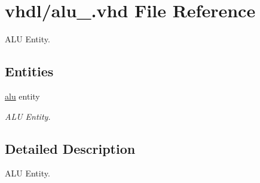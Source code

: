 \hypertarget{alu___8vhd}{}\section{vhdl/alu\+\_\+.vhd File Reference}
\label{alu___8vhd}


A\+LU Entity.  


\subsection*{Entities}
\begin{DoxyCompactItemize}
\item 
\hyperlink{classalu}{alu} entity
\begin{DoxyCompactList}\small\item\em A\+LU Entity. \end{DoxyCompactList}\end{DoxyCompactItemize}


\subsection{Detailed Description}
A\+LU Entity. 

